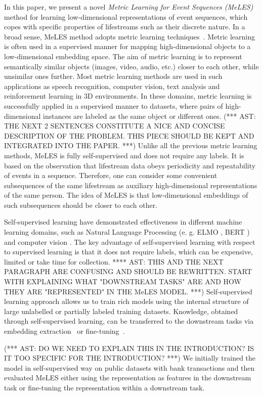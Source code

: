 \documentclass[sigconf, anonymous]{acmart}
\begin{document}
In this paper, we present a novel \emph{Metric Learning for Event Sequences (MeLES)} method for learning low-dimensional representations of event sequences, which copes with specific properties of lifestreams such as their discrete nature. In a broad sense, MeLES method adopts metric learning techniques~\cite{???}. Metric learning is often used in a supervised manner for mapping high-dimensional objects to a low-dimensional embedding space. The aim of metric learning is to represent semantically similar objects (images, video, audio, etc.) closer to each other, while unsimilar ones further. Most metric learning methods are used in such applications as speech recognition, computer vision, text analysis and reinforcement learning in 3D environments. In these domains, metric learning is successfully applied in a supervised manner to datasets, where pairs of high-dimensional instances are labeled as the same object or different ones. 
(*** AST: THE NEXT 2 SENTENCES CONSTITUTE A NICE AND CONCISE DESCRIPTION OF THE PROBLEM. THIS PIECE SHOULD BE KEPT AND INTEGRATED INTO THE PAPER. ***) Unlike all the previous metric learning methods, MeLES is fully self-supervised and does not require any labels. It is based on the observation that lifestream data obeys periodicity and repeatability of events in a sequence. Therefore, one can consider some convenient subsequences of the same lifestream as auxiliary high-dimensional representations of the same person. The idea of MeLES is that low-dimensional embeddings of such subsequences should be closer to each other.


Self-supervised learning have demonstrated effectiveness in different machine learning domains, such as Natural Language Processing (e. g. ELMO \cite{ELMO2018}, BERT \cite{Devlin2019BERTPO}) and computer vision \cite{doersch2015unsupervised}. The key advantage of self-supervised learning with respect to supervised learning is that it does not require labels, which can be expensive, limited or take time for collection. 
**** AST: THIS AND THE NEXT PARAGRAPH ARE CONFUSING AND SHOULD BE REWRITTEN. START WITH EXPLAINING WHAT "DOWNSTREAM TASKS" ARE AND HOW THEY ARE "REPRESENTED" IN THE MeLES MODEL. ***)
Self-supervised learning approach allows us to train rich models using the internal structure of large unlabelled or partially labeled training datasets. Knowledge, obtained through self-supervised learning, can be transferred to the downstream tasks via embedding extraction~\cite{word2vec} or fine-tuning~\cite{Devlin2019BERTPO}.

(*** AST: DO WE NEED TO EXPLAIN THIS IN THE INTRODUCTION? IS IT TOO SPECIFIC FOR THE INTRODUCTION? ***)
We initially trained the model in self-supervised way on public datasets with bank transactions and then evaluated MeLES either using the representation as features in the downstream task or fine-tuning the representation within a downstream task.
\end{document}
